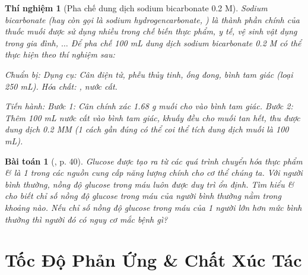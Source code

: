 \documentclass{article}
\newtheorem{baitoan}{Bài toán}
\newtheorem{thinghiem}{Thí nghiệm}
\begin{document}
\begin{thinghiem}[Pha chế dung dịch sodium bicarbonate 0.2 M]
	Sodium bicarbonate (hay còn gọi là sodium hydrogencarbonate, ) là thành phần chính của thuốc muối được sử dụng nhiều trong chế biến thực phẩm, y tế, vệ sinh vật dụng trong gia đình, $\ldots$ Để pha chế 100 mL dung dịch sodium bicarbonate 0.2 M có thể thực hiện theo thí nghiệm sau:
	
	\emph{Chuẩn bị:} Dụng cụ: Cân điện tử, phễu thủy tinh, ống đong, bình tam giác (loại \emph{250 mL}). Hóa chất: \emph{}, nước cất.
	
	\emph{Tiến hành:} Bước 1: Cân chính xác \emph{1.68 g} muối \emph{} cho vào bình tam giác. Bước 2: Thêm \emph{100 mL} nước cất vào bình tam giác, khuấy đều cho muối tan hết, thu được dung dịch \emph{ 0.2 M}M (1 cách gần đúng có thể coi thể tích dung dịch muối  là 100 mL).
\end{thinghiem}

\begin{baitoan}[\cite{SGK_KHTN_8_Canh_Dieu}, p. 40]
	Glucose được tạo ra từ các quá trình chuyển hóa thực phẩm \& là 1 trong các nguồn cung cấp năng lượng chính cho cơ thể chúng ta. Với người bình thường, nồng độ glucose trong máu luôn được duy trì ổn định. Tìm hiểu \& cho biết chỉ số nồng độ glucose trong máu của người bình thường nằm trong khoảng nào. Nếu chỉ số nồng độ glucose trong máu của 1 người lớn hơn mức bình thường thì người đó có nguy cơ mắc bệnh gì?
\end{baitoan}
\noindent{}


\section{Tốc Độ Phản Ứng \& Chất Xúc Tác}
\end{document}
